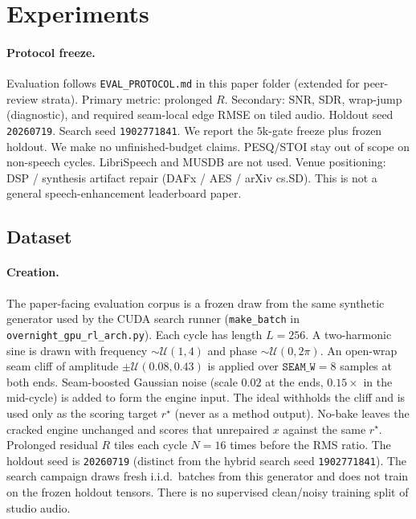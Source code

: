 \section{Experiments}
\label{sec:experiments}

\paragraph{Protocol freeze.}
Evaluation follows \texttt{EVAL\_PROTOCOL.md} in this paper folder (extended for peer-review strata).
Primary metric: prolonged $R$. Secondary: SNR, SDR, wrap-jump (diagnostic), and required seam-local edge RMSE on tiled audio.
Holdout seed \texttt{20260719}. Search seed \texttt{1902771841}.
We report the $5$k-gate freeze plus frozen holdout. We make no unfinished-budget claims. PESQ/STOI stay out of scope on non-speech cycles.
LibriSpeech and MUSDB are not used.
Venue positioning: DSP / synthesis artifact repair (DAFx / AES / arXiv cs.SD).
This is not a general speech-enhancement leaderboard paper.

\subsection{Dataset}
\label{sec:dataset}

\paragraph{Creation.}
The paper-facing evaluation corpus is a frozen draw from the same synthetic generator used by the CUDA search runner (\texttt{make\_batch} in \texttt{overnight\_gpu\_rl\_arch.py}).
Each cycle has length $L{=}256$.
A two-harmonic sine is drawn with frequency $\sim\mathcal{U}(1,4)$ and phase $\sim\mathcal{U}(0,2\pi)$.
An open-wrap seam cliff of amplitude $\pm\mathcal{U}(0.08,0.43)$ is applied over $\texttt{SEAM\_W}{=}8$ samples at both ends.
Seam-boosted Gaussian noise (scale $0.02$ at the ends, $0.15\times$ in the mid-cycle) is added to form the engine input.
The ideal withholds the cliff and is used only as the scoring target $r^{\star}$ (never as a method output).
No-bake leaves the cracked engine unchanged and scores that unrepaired $x$ against the same $r^{\star}$.
Prolonged residual $R$ tiles each cycle $N{=}16$ times before the RMS ratio.
The holdout seed is \texttt{20260719} (distinct from the hybrid search seed \texttt{1902771841}).
The search campaign draws fresh i.i.d.\ batches from this generator and does not train on the frozen holdout tensors.
There is no supervised clean/noisy training split of studio audio.

